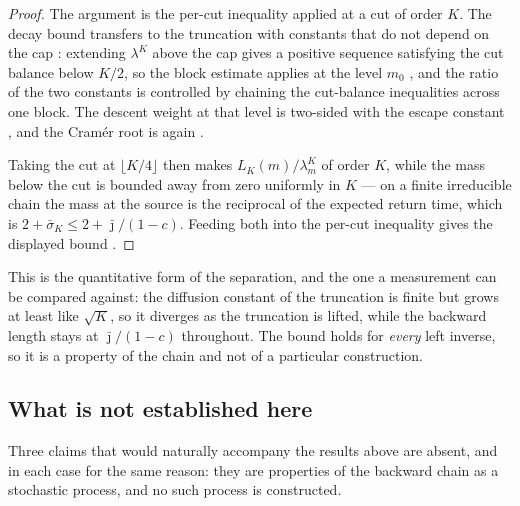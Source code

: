 \begin{proof}
The argument is the per-cut inequality applied at a cut of order $K$. The decay bound transfers
to the truncation with constants that do not depend on the cap
: extending $\lambda^K$ above the cap gives a positive
sequence satisfying the cut balance below $K/2$, so the block estimate applies at the level
$m_0$ , and the ratio of the two constants is controlled by
chaining the cut-balance inequalities across one block. The descent weight at that level is
two-sided  with the escape constant
, and the Cram\'er root is again
.

Taking the cut at $\lfloor K/4\rfloor$ then makes $L_K(m)/\lambda^K_m$ of order $K$, while the
mass below the cut is bounded away from zero uniformly in $K$ --- on a finite irreducible chain
the mass at the source is the reciprocal of the expected return time, which is
$2+\bar\sigma_K\leq2+\bar\jmath/(1-c)$. Feeding both into the per-cut inequality gives the
displayed bound .
\end{proof}

\noindent This is the quantitative form of the separation, and the one a measurement can be compared
against: the diffusion constant of the truncation is finite but grows at least like $\sqrt K$,
so it diverges as the truncation is lifted, while the backward length stays at
$\bar\jmath/(1-c)$ throughout. The bound holds for \emph{every} left inverse, so it is a
property of the chain and not of a particular construction.


\subsection{What is not established here}\label{sec:doubling_differences}

Three claims that would naturally accompany the results above are absent, and in each case for
the same reason: they are properties of the backward chain as a stochastic process, and no such
process is constructed.

